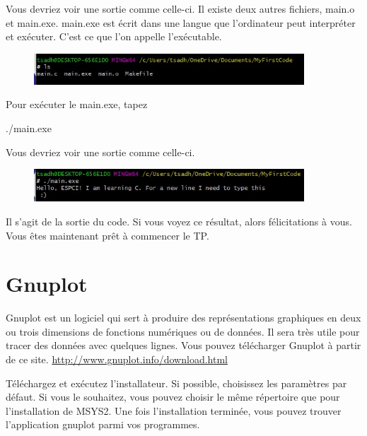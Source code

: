 \documentclass{article}
\begin{document}
Vous devriez voir une sortie comme celle-ci. Il existe deux autres fichiers, main.o et main.exe. main.exe est écrit dans une langue que l'ordinateur peut interpréter et exécuter. C'est ce que l'on appelle l'exécutable.
 \begin{figure}[H]
\center
\includegraphics[width=0.9\textwidth]{Plots/FirstCode_7.jpeg}
\end{figure}
Pour exécuter le main.exe, tapez
\begin{tcolorbox}[width=\textwidth,colframe=MidnightBlue,colback={black},title={Ceci est la console MinGW-w64 Win64 Shell},outer arc=0mm,colupper=white]    
      ./main.exe
\end{tcolorbox}
Vous devriez voir une sortie comme celle-ci. 
\begin{figure}[H]
\center
\includegraphics[width=0.9\textwidth]{Plots/FirstCode_8.jpeg}
\end{figure}
Il s'agit de la sortie du code. Si vous voyez ce résultat, alors félicitations à vous. Vous êtes maintenant prêt à commencer le TP.
\section{Gnuplot}
Gnuplot est un logiciel qui sert à produire des représentations graphiques en deux ou trois dimensions de fonctions numériques ou de données. Il sera très utile pour tracer des données avec quelques lignes. Vous pouvez télécharger Gnuplot à partir de ce site. \href{http://www.gnuplot.info/download.html}{http://www.gnuplot.info/download.html} 

Téléchargez et exécutez l'installateur. Si possible, choisissez les paramètres par défaut. Si vous le souhaitez, vous pouvez choisir le même répertoire que pour l'installation de MSYS2. Une fois l'installation terminée, vous pouvez trouver l'application gnuplot parmi vos programmes. 



%  
\end{document}
